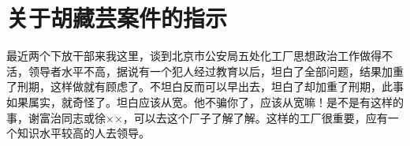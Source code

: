 \section[关于胡藏芸案件的指示（一九六四年二月）]{关于胡藏芸案件的指示}


最近两个下放干部来我这里，谈到北京市公安局五处化工厂思想政治工作做得不活，领导者水平不高，据说有一个犯人经过教育以后，坦白了全部问题，结果加重了刑期，这样做就有顾虑了。不坦白反而可以早出去，坦白了却加重了刑期，此事如果属实，就奇怪了。坦白应该从宽。他不骗你了，应该从宽嘛！是不是有这样的事，谢富治同志或徐××，可以去这个厂子了解了解。这样的工厂很重要，应有一个知识水平较高的人去领导。


